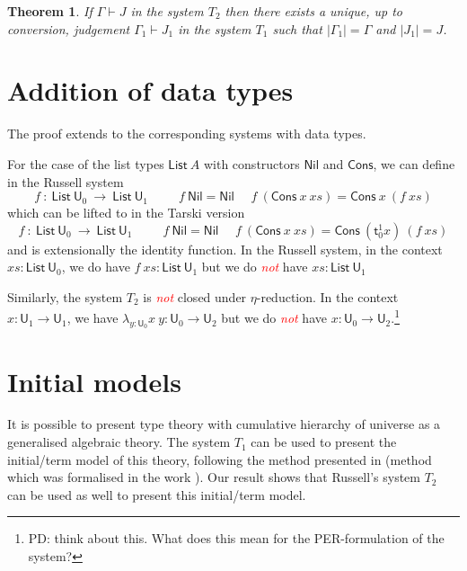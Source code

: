 \documentclass[11pt,a4paper]{article}
\newtheorem{theorem}{Theorem}[section]
\theoremstyle{definition}
\def\UU{\mathsf{U}}
\def\List{\mathsf{List}}
\def\Cons{\mathsf{Cons}}
\def\Nil{\mathsf{Nil}}
\newcommand{\sT}{\mathsf{t}}
\newcommand{\EMP}[1]{\emph{\textcolor{red}{#1}}}
\begin{document}
\begin{theorem}
  If $\Gamma\vdash J$ in the system $T_2$ then there exists a unique, up to conversion, judgement $\Gamma_1\vdash J_1$
  in the system $T_1$ such that $|\Gamma_1| = \Gamma$ and $|J_1| = J$.
\end{theorem}

\section{Addition of data types}

The proof extends to the corresponding systems with data types.

For the case of the list types $\List~A$ with constructors $\Nil$ and $\Cons$, we can define in the Russell system
$$
f~:~\List~\UU_0~\rightarrow~\List~\UU_1~~~~~~~~~~~
f~\Nil = \Nil~~~~~~f~(\Cons~x~xs) = \Cons~x~(f~xs)
$$
which can be lifted to in the Tarski version
$$
f~:~\List~\UU_0~\rightarrow~\List~\UU_1~~~~~~~~~~~
f~\Nil = \Nil~~~~~~f~(\Cons~x~xs) = \Cons~(\sT_0^1 x)~(f~xs)
$$
and is extensionally the identity function.
In the Russell system, in the context  $xs:\List~\UU_0$,
we do have $f~xs:\List~\UU_1$ but we do \EMP{not} have $xs:\List~\UU_1$

\medskip

     Similarly, the system $T_2$ is \EMP{not} closed under $\eta$-reduction. In the context
     $x:\UU_1\rightarrow\UU_1$, 
     we have $\lambda_{y:\UU_0}x~y:\UU_0\rightarrow\UU_2$ but we do \EMP{not} have
     $x:\UU_0\rightarrow\UU_2$.\footnote{PD: think about this. What does this mean for the PER-formulation of the system?}




\section{Initial models}

It is possible to present type theory with cumulative hierarchy of universe as a generalised algebraic theory.
The system $T_1$ can be used to present the initial/term model of this theory, following the method presented in \cite{Streicher:semtt}
(method which was formalised in the work \cite{brunerie:initiality}).
Our result shows that Russell's system $T_2$ can be used as well to present this initial/term model.





\end{document}
